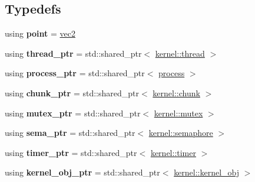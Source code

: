 \subsection*{Typedefs}
\begin{DoxyCompactItemize}
\item 
\mbox{\label{namespaceeka2l1_a62371961d9872645fd7ee387d803f4db}} 
using {\bfseries point} = \mbox{\hyperlink{structeka2l1_1_1vec2}{vec2}}
\item 
\mbox{\label{namespaceeka2l1_a7645254e274ad9352945bb542d3328b2}} 
using {\bfseries thread\+\_\+ptr} = std\+::shared\+\_\+ptr$<$ \mbox{\hyperlink{classeka2l1_1_1kernel_1_1thread}{kernel\+::thread}} $>$
\item 
\mbox{\label{namespaceeka2l1_a97c5896d723ed30f5464679cb3542f2c}} 
using {\bfseries process\+\_\+ptr} = std\+::shared\+\_\+ptr$<$ \mbox{\hyperlink{classeka2l1_1_1process}{process}} $>$
\item 
\mbox{\label{namespaceeka2l1_a2348fa299d4a087c65051eb42ddc5edd}} 
using {\bfseries chunk\+\_\+ptr} = std\+::shared\+\_\+ptr$<$ \mbox{\hyperlink{classeka2l1_1_1kernel_1_1chunk}{kernel\+::chunk}} $>$
\item 
\mbox{\label{namespaceeka2l1_a53c0fe11d3558a222e206407303530b4}} 
using {\bfseries mutex\+\_\+ptr} = std\+::shared\+\_\+ptr$<$ \mbox{\hyperlink{classeka2l1_1_1kernel_1_1mutex}{kernel\+::mutex}} $>$
\item 
\mbox{\label{namespaceeka2l1_aaec50108ebdb515e81d712dbbba68f66}} 
using {\bfseries sema\+\_\+ptr} = std\+::shared\+\_\+ptr$<$ \mbox{\hyperlink{classeka2l1_1_1kernel_1_1semaphore}{kernel\+::semaphore}} $>$
\item 
\mbox{\label{namespaceeka2l1_a357cf0983a37336729cfd413c2164fdb}} 
using {\bfseries timer\+\_\+ptr} = std\+::shared\+\_\+ptr$<$ \mbox{\hyperlink{classeka2l1_1_1kernel_1_1timer}{kernel\+::timer}} $>$
\item 
\mbox{\label{namespaceeka2l1_a8cc738c011a36dfbc97581d24954cd2b}} 
using {\bfseries kernel\+\_\+obj\+\_\+ptr} = std\+::shared\+\_\+ptr$<$ \mbox{\hyperlink{classeka2l1_1_1kernel_1_1kernel__obj}{kernel\+::kernel\+\_\+obj}} $>$

\end{DoxyCompactItemize}
